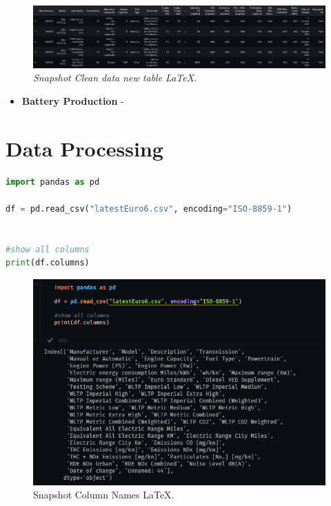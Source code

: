  \begin{figure}[H]
    \centering
    \includegraphics[scale=0.38]{figures/Vehicle Emissions.png}
    \caption{\textit{Snapshot Clean data new table \LaTeX}.}
    \label{fig:chart_1}
\end{figure}
\begin{itemize}
    \item \textbf{Battery Production} - 
\end{itemize}
 


\section{Data Processing}
\begin{lstlisting}[language=Python, caption={Code snippet in \LaTeX ~and  this is a Python code }, label=list:python_code_ex]
import pandas as pd

df = pd.read_csv("latestEuro6.csv", encoding="ISO-8859-1")


#show all columns
print(df.columns)
\end{lstlisting}
\begin{figure}[H]
    \centering
    \includegraphics[scale=0.85]{figures/ColumnNames.png}
    \caption{Snapshot Column Names \LaTeX.}
    \label{fig:chart_1}
\end{figure}

